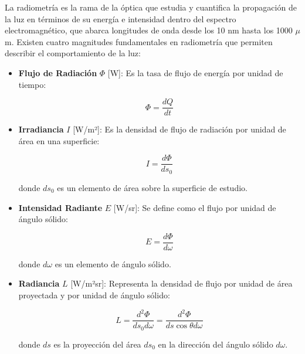 La radiometría es la rama de la óptica que estudia y cuantifica la propagación de la luz en términos de su energía e intensidad dentro del espectro electromagnético, que abarca longitudes de onda desde los 10 nm hasta los 1000 $\mu$m. Existen cuatro magnitudes fundamentales en radiometría que permiten describir el comportamiento de la luz:

\begin{itemize}
\item \textbf{Flujo de Radiación} $\Phi$ [W]: Es la tasa de flujo de energía por unidad de tiempo:

\begin{mdframed}
\begin{equation}
\Phi = \frac{dQ}{dt}
\end{equation}
\end{mdframed}

\item \textbf{Irradiancia} $I$ [W/m²]: Es la densidad de flujo de radiación por unidad de área en una superficie:

\begin{mdframed}
\begin{equation}
    I = \frac{d\Phi}{ds_0}
\end{equation}
\end{mdframed}

donde $ds_0$ es un elemento de área sobre la superficie de estudio.

\item \textbf{Intensidad Radiante} $E$ [W/sr]: Se define como el flujo por unidad de ángulo sólido:

\begin{mdframed}
\begin{equation}
    E = \frac{d\Phi}{d\omega}
\end{equation}
\end{mdframed}

donde $d\omega$ es un elemento de ángulo sólido.

\item \textbf{Radiancia} $L$ [W/m²sr]: Representa la densidad de flujo por unidad de área proyectada y por unidad de ángulo sólido:

\begin{mdframed}
\begin{equation}
    L = \frac{d^2\Phi}{ds_0 d\omega} = \frac{d^2\Phi}{ds \cos\theta d\omega}
\end{equation}
\end{mdframed}

donde $ds$ es la proyección del área $ds_0$ en la dirección del ángulo sólido $d\omega$.

\end{itemize}

